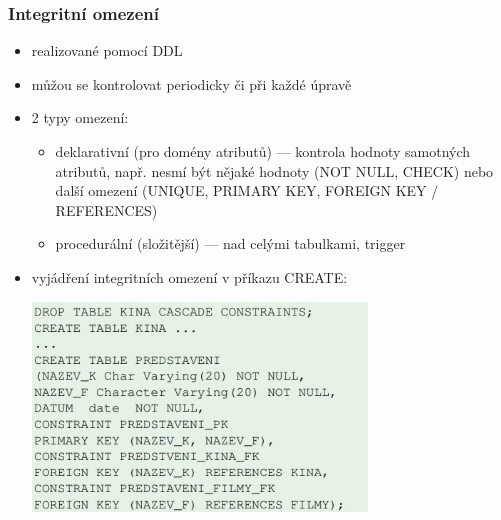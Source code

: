 \subsubsection*{Integritní omezení}
\begin{itemize}
	\item realizované pomocí DDL
	\item můžou se kontrolovat periodicky či při každé úpravě
	\item 2 typy omezení:
	\begin{itemize}
		\item deklarativní (pro domény atributů) --- kontrola hodnoty samotných atributů, např. nesmí být nějaké hodnoty (NOT NULL, CHECK) nebo další omezení (UNIQUE, PRIMARY KEY, FOREIGN KEY / REFERENCES)
		\item procedurální (složitější) --- nad celými tabulkami, trigger
	\end{itemize}
	\item vyjádření integritních omezení v příkazu CREATE:
	
	\includegraphics[width=0.7\textwidth]{img/SP-5_0.jpg}
\end{itemize}